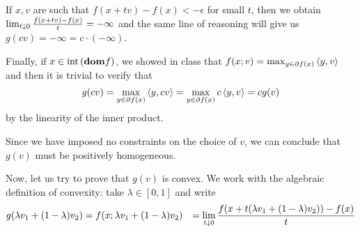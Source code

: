 \documentclass[10pt]{article}
\begin{document}
\begin{Exercise}
\begin{enumerate}
			If $x, v$ are such that $f(x + tv) - f(x) < -\epsilon$ for small
			$t$, then we obtain $\lim_{t \downarrow 0} \frac{f(x + tv) - f(x)}{t} =
			-\infty$ and the same line of reasoning will give us
			\( g(cv) = -\infty = c \cdot (-\infty) \).

			Finally, if $x \in \mathrm{int}\left( \textbf{dom} f \right)$, we showed in class that
			$f(x; v) = \max_{y \in \partial f(x)} \left\langle y, v \right\rangle$ and then it is
			trivial to verify that
			\[
				g(cv) = \max_{y \in \partial f(x)} \left\langle y, cv \right\rangle =
					\max_{y \in \partial f(x)} c \left\langle y, v \right\rangle = c g(v)
			\]
			by the linearity of the inner product.
	\end{enumerate}
	Since we have imposed no constraints on the choice of $v$, we can conclude
	that $g(v)$ must be positively homogeneous.

	Now, let us try to prove that $g(v)$ is convex. We work with the algebraic
	definition of convexity: take $\lambda \in [0, 1]$ and write
	\begin{align*}
		g(\lambda v_1 +( 1 - \lambda )v_2) &= f(x; \lambda v_1 + (1 - \lambda)
		v_2) &= \lim_{t \downarrow 0} \frac{f(x + t (\lambda v_1 + (1 - \lambda)
		v_2)) - f(x)}{t}
	\end{align*}

\end{Exercise}
\end{document}
